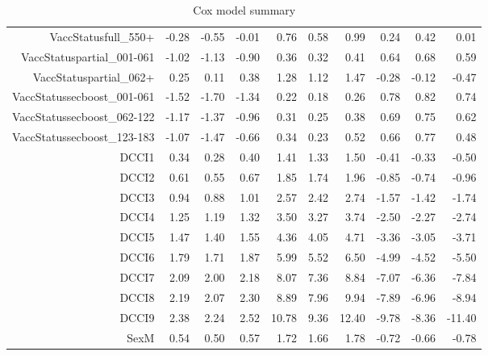 \begin{table}[ht]
\begin{tabular}{rrrrrrrrrr}
  VaccStatusfull\_550+ & -0.28 & -0.55 & -0.01 & 0.76 & 0.58 & 0.99 & 0.24 & 0.42 & 0.01 \\ 
  VaccStatuspartial\_001-061 & -1.02 & -1.13 & -0.90 & 0.36 & 0.32 & 0.41 & 0.64 & 0.68 & 0.59 \\ 
  VaccStatuspartial\_062+ & 0.25 & 0.11 & 0.38 & 1.28 & 1.12 & 1.47 & -0.28 & -0.12 & -0.47 \\ 
  VaccStatussecboost\_001-061 & -1.52 & -1.70 & -1.34 & 0.22 & 0.18 & 0.26 & 0.78 & 0.82 & 0.74 \\ 
  VaccStatussecboost\_062-122 & -1.17 & -1.37 & -0.96 & 0.31 & 0.25 & 0.38 & 0.69 & 0.75 & 0.62 \\ 
  VaccStatussecboost\_123-183 & -1.07 & -1.47 & -0.66 & 0.34 & 0.23 & 0.52 & 0.66 & 0.77 & 0.48 \\ 
  DCCI1 & 0.34 & 0.28 & 0.40 & 1.41 & 1.33 & 1.50 & -0.41 & -0.33 & -0.50 \\ 
  DCCI2 & 0.61 & 0.55 & 0.67 & 1.85 & 1.74 & 1.96 & -0.85 & -0.74 & -0.96 \\ 
  DCCI3 & 0.94 & 0.88 & 1.01 & 2.57 & 2.42 & 2.74 & -1.57 & -1.42 & -1.74 \\ 
  DCCI4 & 1.25 & 1.19 & 1.32 & 3.50 & 3.27 & 3.74 & -2.50 & -2.27 & -2.74 \\ 
  DCCI5 & 1.47 & 1.40 & 1.55 & 4.36 & 4.05 & 4.71 & -3.36 & -3.05 & -3.71 \\ 
  DCCI6 & 1.79 & 1.71 & 1.87 & 5.99 & 5.52 & 6.50 & -4.99 & -4.52 & -5.50 \\ 
  DCCI7 & 2.09 & 2.00 & 2.18 & 8.07 & 7.36 & 8.84 & -7.07 & -6.36 & -7.84 \\ 
  DCCI8 & 2.19 & 2.07 & 2.30 & 8.89 & 7.96 & 9.94 & -7.89 & -6.96 & -8.94 \\ 
  DCCI9 & 2.38 & 2.24 & 2.52 & 10.78 & 9.36 & 12.40 & -9.78 & -8.36 & -11.40 \\ 
  SexM & 0.54 & 0.50 & 0.57 & 1.72 & 1.66 & 1.78 & -0.72 & -0.66 & -0.78 \\ 
   \hline
\end{tabular}
\caption{Cox model summary} 
\end{table}
